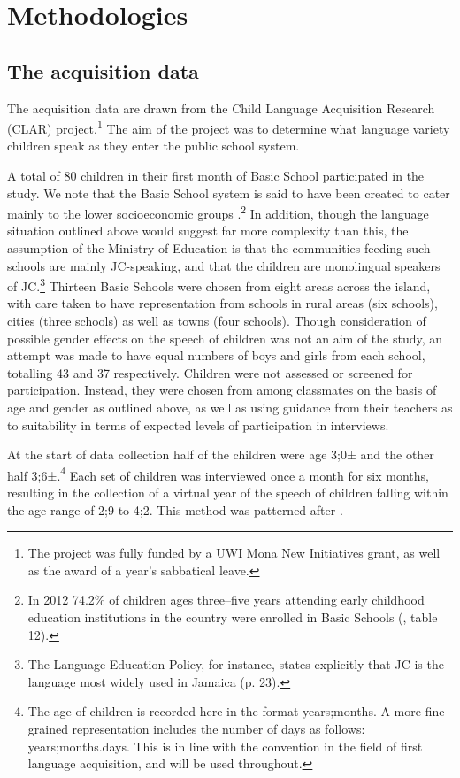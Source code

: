 \documentclass[output=paper,colorlinks,citecolor=brown]{langscibook}
\begin{document}
\section{Methodologies} \label{sec:messamk:3}
\subsection{The acquisition data} \label{sec:messamk:3.1}

The acquisition data are drawn from the Child Language Acquisition Research (CLAR) project.\footnote{The project was fully funded by a UWI Mona New Initiatives grant, as well as the award of a year’s sabbatical leave.} The aim of the project was to determine what language variety children speak as they enter the public school system.

A total of 80 children in their first month of Basic School participated in the study. We note that the Basic School system is said to have been created to cater mainly to the lower socioeconomic groups \citep{Miller2015}.\footnote{In 2012 74.2\% of children ages three--five years attending early childhood education institutions in the country were enrolled in Basic Schools (\citealt[15]{SABERCountryReport2013}, table 12).} In addition, though the language situation outlined above would suggest far more complexity than this, the assumption of the Ministry of Education is that the communities feeding such schools are mainly JC-speaking, and that the children are monolingual speakers of JC.\footnote{The \citeyear{MinistryofEducation2001} Language Education Policy, for instance, states explicitly that JC is the language most widely used in Jamaica (p. 23).} Thirteen Basic Schools were chosen from eight areas across the island, with care taken to have representation from schools in rural areas (six schools), cities (three schools) as well as towns (four schools). Though consideration of possible gender effects on the speech of children was not an aim of the study, an attempt was made to have equal numbers of boys and girls from each school, totalling 43 and 37 respectively. Children were not assessed or screened for participation. Instead, they were chosen from among classmates on the basis of age and gender as outlined above, as well as using guidance from their teachers as to suitability in terms of expected levels of participation in interviews.

At the start of data collection half of the children were age 3;0± and the other half 3;6±.\footnote{The age of children is recorded here in the format years;months. A more fine-grained representation includes the number of days as follows: years;months.days. This is in line with the convention in the field of first language acquisition, and will be used throughout.} Each set of children was interviewed once a month for six months, resulting in the collection of a virtual year of the speech of children falling within the age range of 2;9 to 4;2. This method was patterned after \citet{Meade2001}.
\end{document}
